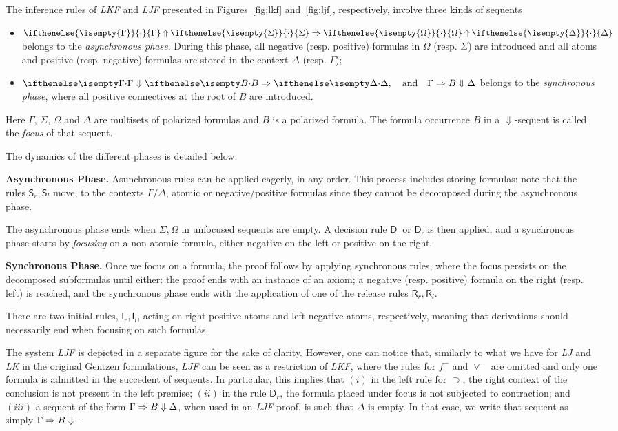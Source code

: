\documentclass{easychair}
\newcommand{\seq}{\Rightarrow}
\newcommand\proofsystem[1]{\mbox{\slshape #1}\xspace}
\newcommand\LK   {\proofsystem{LK}}
\newcommand\LKF  {\proofsystem{LKF}}
\newcommand\LJ   {\proofsystem{LJ}}
\newcommand\LJF  {\proofsystem{LJF}}
\newcommand{\impl}{\supset}
\newcommand{\kstore}{\mathsf{S}}
\newcommand{\kdecide}{\mathsf{D}}
\newcommand{\krelease}{\mathsf{R}}
\newcommand{\kinit}{\mathsf{I}}
\newcommand{\isemp}[1]{\ifthenelse{\isempty{#1}}{\cdot}{#1}}
\newcommand{\jUnf}[4]{\isemp{#1}\mathbin{\Uparrow}\isemp{#2}\seq
                      \isemp{#3}\mathbin{\Uparrow}\isemp{#4}}
\newcommand{\nfalse}{f^-}
\newcommand{\veen}{\vee^{\!-}}
\begin{document}
The inference rules of \LKF and \LJF presented in Figures~\ref{fig:lkf} and~\ref{fig:ljf}, respectively, involve three kinds of sequents 
\begin{itemize}
\item $\jUnf{\Gamma}{\Sigma}{\Omega}{\Delta}$ belongs to the {\em asynchronous phase}. During this phase, all negative (resp. positive) formulas in  $\Omega$ (resp. $\Sigma$) are introduced and all atoms and positive (resp. negative) formulas  are stored in the context $\Delta$ (resp. $\Gamma$);
\item $\jLf{\Gamma}{B}{\Delta},\quad\hbox{and}\quad
  \jRf{\Gamma}{B}{\Delta}$ belongs to the {\em synchronous phase}, where all positive connectives at the root of $B$ are introduced. 
\end{itemize}
Here $\Gamma$, $\Sigma$, $\Omega$ and $\Delta$ are
multisets of polarized formulas and $B$ is a polarized formula.
The formula occurrence $B$ in a $\Downarrow$-sequent is called the
\emph{focus} of that sequent.

The dynamics of the different phases is detailed below.

\noindent
{\bf Asynchronous Phase.} Asunchronous rules can be applied eagerly, in any order.
This process includes storing formulas: note that the rules $\kstore_r, \kstore_l$ move, to the 
contexts $\Gamma/\Delta$, atomic or negative/positive formulas since they cannot be decomposed during the asynchronous phase.

The asynchronous phase ends when $\Sigma,\Omega$ in unfocused sequents are empty. A decision rule $\mathsf{D_l}$ or  $\mathsf{D_r}$ is then applied,  and
a synchronous phase starts by {\em focusing} on a non-atomic formula, either negative on the left or positive on the right.

\noindent
{\bf Synchronous Phase.} Once we focus on a formula, the proof  follows by applying synchronous rules, where  the focus persists on the decomposed subformulas until either: the proof ends with an instance of an axiom;
a negative (resp. positive) formula  on the right (resp. left) is reached, and the synchronous phase  ends with the application of one of the release rules $\krelease_r,\krelease_l$.

There are two initial rules, $\kinit_r,\kinit_l$, acting on right positive atoms and left negative atoms, respectively, meaning that derivations should necessarily end when focusing on such formulas.


The system  \LJF is depicted in a separate figure for the sake of clarity.
However, one can notice that, similarly to what we have for \LJ and
\LK in the original Gentzen formulations, \LJF can be seen as a
restriction of \LKF, where the rules for $\nfalse$ and $\veen$ are
omitted and only one formula is admitted in the succedent of sequents.  In
particular, this implies that $(i)$ in the left rule for $\impl$, the
right context of the conclusion is not present in the left premise;
$(ii)$ in the rule $\kdecide_r$, the formula placed under focus is
not subjected to contraction; and $(iii)$ a sequent of the form $\jRf{\Gamma}{B}{\Delta}$, when used in an
\LJF proof, is such that $\Delta$ is empty.
In that case, we write that sequent as simply $\jRf{\Gamma}{B}{}$.
\end{document}
